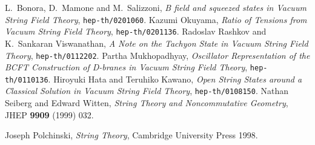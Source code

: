 \documentclass[letterpaper,12pt]{article}
\begin{document}
\begin{thebibliography}{99}
 L.~Bonora, D.~Mamone and M.~Salizzoni, \emph{B field and squeezed states in Vacuum String Field Theory}, \texttt{hep-th/0201060}.
 Kazumi Okuyama, \emph{Ratio of Tensions from Vacuum String Field Theory}, \texttt{hep-th/0201136}.
 Radoslav Rashkov and K.~Sankaran Viswanathan, \emph{A Note on the Tachyon State in Vacuum String Field Theory}, \texttt{hep-th/0112202}.
 Partha Mukhopadhyay, \emph{Oscillator Representation of the BCFT Construction of D-branes in Vacuum String Field Theory}, \texttt{hep-th/0110136}.
 Hiroyuki Hata and Teruhiko Kawano, \emph{Open String States around a Classical Solution in Vacuum String Field Theory}, \texttt{hep-th/0108150}.
 Nathan Seiberg and Edward Witten, \emph{String Theory and Noncommutative Geometry}, JHEP \textbf{9909} (1999) 032. %

 Joseph Polchinski, \emph{String Theory}, Cambridge University Press 1998.

\end{thebibliography}
\end{document}
